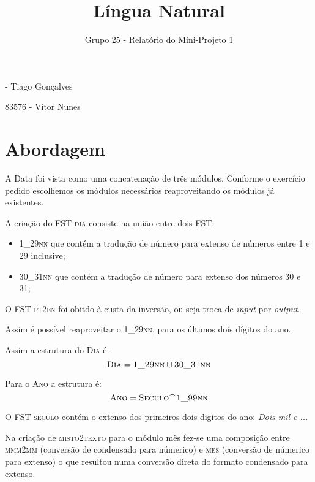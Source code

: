 \documentclass[12pt]{article}
\begin{document}
\title{\vspace{-3cm}Língua Natural}
\author{Grupo 25 - Relatório do Mini-Projeto 1}
\date{}

 - Tiago Gonçalves

83576 - Vítor Nunes

\section*{Abordagem}
A Data foi vista como uma concatenação de três módulos. Conforme o exercício pedido escolhemos os módulos necessários reaproveitando os módulos já existentes.
\newline

A criação do FST \textsc{dia} consiste na união entre dois FST:
\begin{itemize}
	\item \textsc{1{\_}29nn} que contém a tradução de número para extenso de números entre 1 e 29 inclusive;
	\item \textsc{30{\_}31nn} que contém a tradução de número para extenso dos números 30 e 31;
\end{itemize}

O FST \textsc{pt2en} foi obitdo à custa da inversão, ou seja troca de \textit{input} por \textit{output}.

Assim é possível reaproveitar o \textsc{1{\_}29nn}, para os últimos dois dígitos do ano.

Assim a estrutura do \textsc{Dia} é:
$$ \textsc{Dia} = \textsc{1{\_}29nn} \cup \textsc{30{\_}31nn}  $$

Para o \textsc{Ano} a estrutura é:
$$ \textsc{Ano} = \textsc{Seculo} ^\frown \textsc{1{\_}99nn}  $$

O FST \textsc{seculo} contém o extenso dos primeiros dois digitos do ano: \textit{Dois mil e ...}

Na criação de \textsc{misto2texto} para o módulo mês fez-se uma composição entre \textsc{mmm2mm} (conversão de condensado para númerico) e \textsc{mes} (conversão de númerico para extenso) o que resultou numa conversão direta do formato condensado para extenso.
\end{document}

